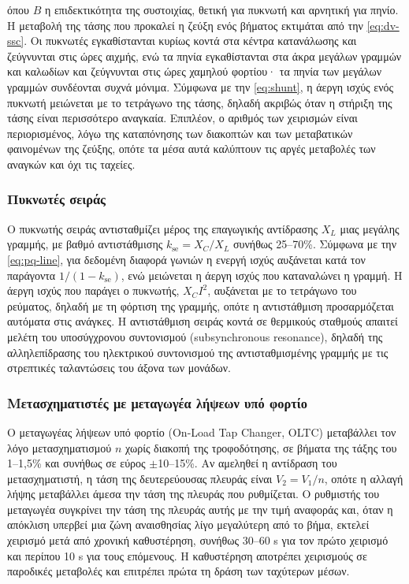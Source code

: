 όπου $B$ η επιδεκτικότητα της συστοιχίας, θετική για πυκνωτή και αρνητική για πηνίο. Η
μεταβολή της τάσης που προκαλεί η ζεύξη ενός βήματος εκτιμάται από την \eqref{eq:dv-ssc}. Οι
πυκνωτές εγκαθίστανται κυρίως κοντά στα κέντρα κατανάλωσης και ζεύγνυνται στις ώρες αιχμής,
ενώ τα πηνία εγκαθίστανται στα άκρα μεγάλων γραμμών και καλωδίων και ζεύγνυνται στις ώρες
χαμηλού φορτίου· τα πηνία των μεγάλων γραμμών συνδέονται συχνά μόνιμα. Σύμφωνα με την
\eqref{eq:shunt}, η άεργη ισχύς ενός πυκνωτή μειώνεται με το τετράγωνο της τάσης, δηλαδή
ακριβώς όταν η στήριξη της τάσης είναι περισσότερο αναγκαία. Επιπλέον, ο αριθμός των χειρισμών
είναι περιορισμένος, λόγω της καταπόνησης των διακοπτών και των μεταβατικών φαινομένων της
ζεύξης, οπότε τα μέσα αυτά καλύπτουν τις αργές μεταβολές των αναγκών και όχι τις ταχείες.

\subsubsection{Πυκνωτές σειράς}

Ο πυκνωτής σειράς αντισταθμίζει μέρος της επαγωγικής αντίδρασης $X_L$ μιας μεγάλης γραμμής,
με βαθμό αντιστάθμισης $k_{\mathrm{se}} = X_C / X_L$ συνήθως 25--70\%. Σύμφωνα με την
\eqref{eq:pq-line}, για δεδομένη διαφορά γωνιών η ενεργή ισχύς αυξάνεται κατά τον παράγοντα
$1/(1 - k_{\mathrm{se}})$, ενώ μειώνεται η άεργη ισχύς που καταναλώνει η γραμμή. Η άεργη
ισχύς που παράγει ο πυκνωτής, $X_C I^2$, αυξάνεται με το τετράγωνο του ρεύματος, δηλαδή με τη
φόρτιση της γραμμής, οπότε η αντιστάθμιση προσαρμόζεται αυτόματα στις ανάγκες. Η αντιστάθμιση
σειράς κοντά σε θερμικούς σταθμούς απαιτεί μελέτη του υποσύγχρονου συντονισμού
(subsynchronous resonance), δηλαδή της αλληλεπίδρασης του ηλεκτρικού συντονισμού της
αντισταθμισμένης γραμμής με τις στρεπτικές ταλαντώσεις του άξονα των μονάδων.

\subsubsection{Μετασχηματιστές με μεταγωγέα λήψεων υπό φορτίο}
\label{sec:oltc}

Ο μεταγωγέας λήψεων υπό φορτίο (On-Load Tap Changer, OLTC) μεταβάλλει τον λόγο
μετασχηματισμού $n$ χωρίς διακοπή της τροφοδότησης, σε βήματα της τάξης του 1--1,5\% και
συνήθως σε εύρος $\pm$10--15\%. Αν αμεληθεί η αντίδραση του μετασχηματιστή, η τάση της
δευτερεύουσας πλευράς είναι $V_2 = V_1/n$, οπότε η αλλαγή λήψης μεταβάλλει άμεσα την τάση
της πλευράς που ρυθμίζεται. Ο ρυθμιστής του μεταγωγέα συγκρίνει την τάση της πλευράς αυτής με
την τιμή αναφοράς και, όταν η απόκλιση υπερβεί μια ζώνη αναισθησίας λίγο μεγαλύτερη από το
βήμα, εκτελεί χειρισμό μετά από χρονική καθυστέρηση, συνήθως 30--60 s για τον πρώτο χειρισμό
και περίπου 10 s για τους επόμενους. Η καθυστέρηση αποτρέπει χειρισμούς σε παροδικές
μεταβολές και επιτρέπει πρώτα τη δράση των ταχύτερων μέσων.

